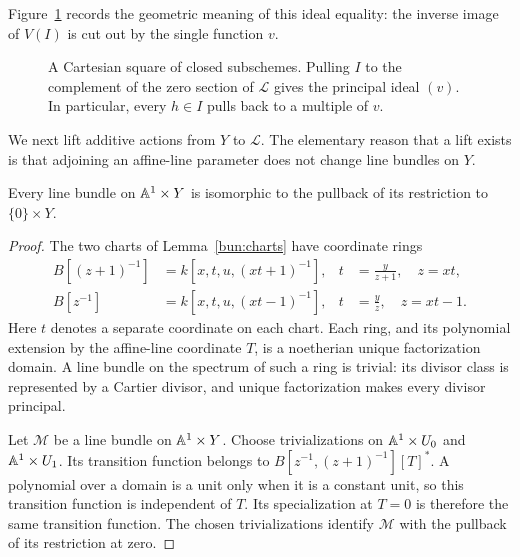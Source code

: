 Figure~\ref{bun:figure} records the geometric meaning of this ideal
equality: the inverse image of $V(I)$ is cut out by the single function $v$.

\begin{figure}[ht]
\centering
{}
\caption{A Cartesian square of closed subschemes.  Pulling $I$ to the
complement of the zero section of $\mathcal L$ gives the principal ideal
$(v)$.  In particular, every $h\in I$ pulls back to a multiple of $v$.}
\label{bun:figure}
\end{figure}

We next lift additive actions from $Y$ to $\mathcal L$.  The elementary
reason that a lift exists is that adjoining an affine-line parameter does
not change line bundles on $Y$.

\begin{lemma}\label{bun:homotopy}
Every line bundle on $\mathbb A^1\times Y$ is isomorphic to the pullback of its
restriction to $\{0\}\times Y$.
\end{lemma}

\begin{proof}
The two charts of Lemma~\ref{bun:charts} have coordinate rings
\begin{align*}
 B[(z+1)^{-1}]&=k[x,t,u,(xt+1)^{-1}],
       &t&=\frac{y}{z+1},\quad z=xt,\\
 B[z^{-1}]&=k[x,t,u,(xt-1)^{-1}],
       &t&=\frac{y}{z},\quad z=xt-1.
\end{align*}
Here $t$ denotes a separate coordinate on each chart.  Each ring, and its
polynomial extension by the affine-line coordinate $T$, is a noetherian
unique factorization domain.  A line bundle on the spectrum of such a
ring is trivial: its divisor class is represented by a Cartier divisor,
and unique factorization makes every divisor principal.

Let $\mathcal M$ be a line bundle on $\mathbb A^1\times Y$.  Choose trivializations
on $\mathbb A^1\times U_0$ and $\mathbb A^1\times U_1$.  Its transition function belongs
to $B[z^{-1},(z+1)^{-1}][T]^*$.  A polynomial over a domain is a unit only
when it is a constant unit, so this transition function is independent of
$T$.  Its specialization at $T=0$ is therefore the same transition
function.  The chosen trivializations identify $\mathcal M$ with the
pullback of its restriction at zero.
\end{proof}

